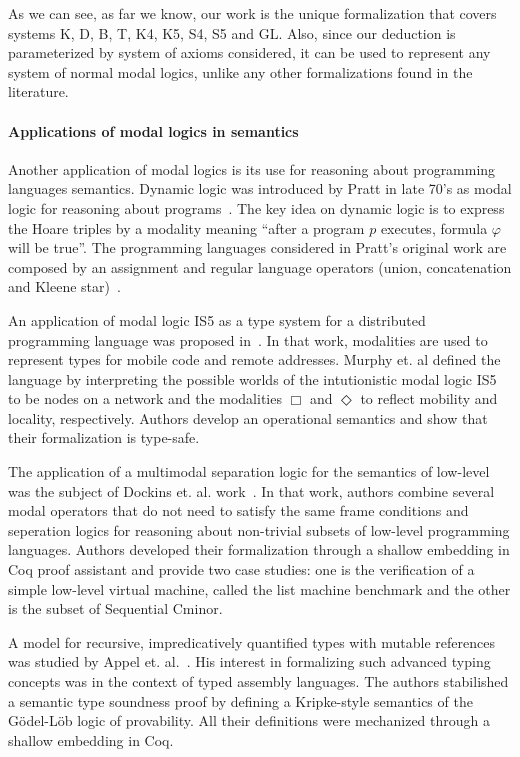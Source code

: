 \documentclass[sigconf,anonymous]{acmart}
\begin{document}
As we can see, as far we know, our work is the unique formalization that covers systems
K, D, B, T, K4, K5, S4, S5 and GL. Also, since our deduction is
parameterized by system of axioms considered, it can be used to represent any
system of normal modal logics, unlike any other formalizations found in the literature.

\paragraph{Applications of modal logics in semantics} Another application of
modal logics is its use for reasoning about programming languages semantics.
Dynamic logic was introduced by Pratt in late 70's as modal logic for reasoning
about programs~\cite{Pratt76,Pratt80}. The key idea on dynamic logic is to express the
Hoare triples by a modality meaning ``after a program $p$ executes, formula
$\varphi$ will be true''. The programming languages considered in Pratt's
original work are composed by an assignment and regular language operators
(union, concatenation and Kleene star)~\cite{Pratt76}.

An application of modal logic IS5 as a type system for a distributed
programming language was proposed in~\cite{Murphy04}. 
In that work, modalities are used to represent types for mobile code
and remote addresses. Murphy et. al defined the language by interpreting
the possible worlds of the intutionistic modal logic IS5 to be nodes on a
network and the modalities $\Box$ and $\Diamond$ to reflect mobility and
locality, respectively. Authors develop an operational semantics and show
that their formalization is type-safe.

The application of a multimodal separation logic for the semantics of low-level
was the subject of Dockins et. al. work~\cite{Dockins08}. In that work, authors
combine several modal operators that do not need to satisfy the same frame
conditions and seperation logics for reasoning about non-trivial subsets of
low-level programming languages. Authors developed their formalization through a
shallow embedding in Coq proof assistant and provide two case studies: one is
the verification of a simple low-level virtual machine, called the list machine
benchmark and the other is the subset of Sequential Cminor.

A model for recursive, impredicatively quantified types with mutable references
was studied by Appel et. al.~\cite{Appel07}. His interest in formalizing such
advanced typing concepts was in the context of typed assembly languages.
The authors stabilished a semantic type soundness proof by defining a Kripke-style 
semantics of the G\"odel-L\"ob logic of provability. All their definitions were
mechanized through a shallow embedding in Coq.
\end{document}

